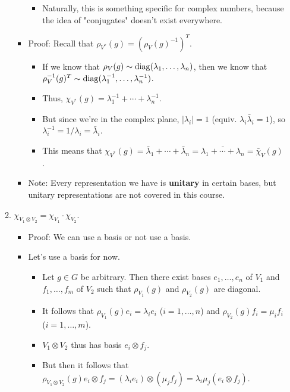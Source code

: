 \documentclass[../notes.tex]{subfiles}
\begin{document}
\begin{itemize}
\begin{enumerate}[resume]
\begin{itemize}
            \begin{itemize}
                \item Naturally, this is something specific for complex numbers, because the idea of "conjugates" doesn't exist everywhere.
            \end{itemize}
            \item Proof: Recall that $\rho_{V^*}(g)=(\rho_V(g)^{-1})^T$.
            \begin{itemize}
                \item If we know that $\rho_V(g)\sim\operatorname{diag}(\lambda_1,\dots,\lambda_n)$, then we know that $\rho_V^{-1}(g)^T\sim\operatorname{diag}(\lambda_1^{-1},\dots,\lambda_n^{-1})$.
                \item Thus, $\chi_{V^*}(g)=\lambda_1^{-1}+\cdots+\lambda_n^{-1}$.
                \item But since we're in the complex plane, $|\lambda_i|=1$ (equiv. $\lambda_i\bar{\lambda}_i=1$), so $\lambda_i^{-1}=1/\lambda_i=\bar{\lambda}_i$.
                \item This means that $\chi_{V^*}(g)=\bar{\lambda}_1+\cdots+\bar{\lambda}_n=\overline{\lambda_1+\cdots+\lambda_n}=\bar{\chi}_V(g)$.
            \end{itemize}
            \item Note: Every representation we have is \textbf{unitary} in certain bases, but unitary representations are not covered in this course.
        \end{itemize}
        \item $\chi_{V_1\otimes V_2}=\chi_{V_1}\cdot\chi_{V_2}$.
        \begin{itemize}
            \item Proof: We can use a basis or not use a basis.
            \item Let's use a basis for now.
            \begin{itemize}
                \item Let $g\in G$ be arbitrary. Then there exist bases $e_1,\dots,e_n$ of $V_1$ and $f_1,\dots,f_m$ of $V_2$ such that $\rho_{V_1}(g)$ and $\rho_{V_2}(g)$ are diagonal.
                \item It follows that $\rho_{V_1}(g)e_i=\lambda_ie_i$ ($i=1,\dots,n$) and $\rho_{V_2}(g)f_i=\mu_if_i$ ($i=1,\dots,m$).
                \item $V_1\otimes V_2$ thus has basis $e_i\otimes f_j$.
                \item But then it follows that $\rho_{V_1\otimes V_2}(g)e_i\otimes f_j=(\lambda_ie_i)\otimes(\mu_jf_j)=\lambda_i\mu_j(e_i\otimes f_j)$.

\end{itemize}
\end{itemize}
\end{enumerate}
\end{itemize}
\end{document}
